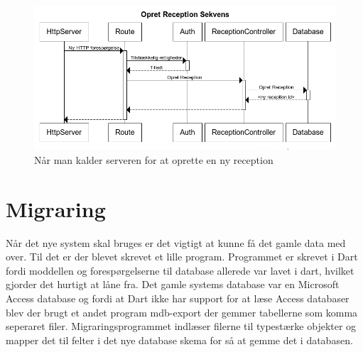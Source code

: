 \begin{figure}[ht!]
\centering
\includegraphics[width=\textwidth]{images/serversequence.png}
\caption{Når man kalder serveren for at oprette en ny reception}
\label{fig:serversequence}
\end{figure}

\pagebreak
\section{Migraring}
Når det nye system skal bruges er det vigtigt at kunne få det gamle data med over. Til det er der blevet skrevet et lille program. Programmet er skrevet i Dart fordi moddellen og forespørgelserne til database allerede var lavet i dart, hvilket gjorder det hurtigt at låne fra. Det gamle systems database var en Microsoft Access database og fordi at Dart ikke har support for at læse Access databaser blev der brugt et andet program mdb-export der gemmer tabellerne som komma seperaret filer. Migraringsprogrammet indlæser filerne til typestærke objekter og mapper det til felter i det nye database skema for så at gemme det i databasen.